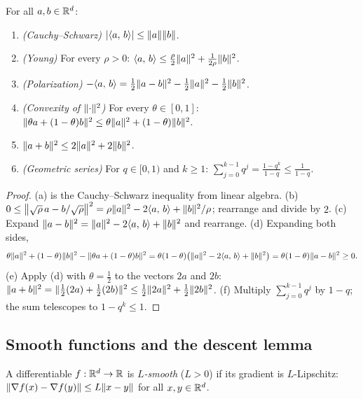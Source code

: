 \begin{lemma}\label{lem:elementary}
For all $a,b\in\mathbb{R}^d$:
\begin{enumerate}[label=\textup{(\alph*)}]
  \item \emph{(Cauchy--Schwarz)} $|\langle a,\, b\rangle|\le\lVert a\rVert\lVert b\rVert$.
  \item \emph{(Young)} For every $\rho>0$:
        $\langle a,\, b\rangle\le\frac{\rho}{2}\lVert a\rVert^2+\frac{1}{2\rho}\lVert b\rVert^2$.
  \item \emph{(Polarization)} $-\langle a,\, b\rangle=\frac12\lVert a-b\rVert^2-\frac12\lVert a\rVert^2-\frac12\lVert b\rVert^2$.
  \item \emph{(Convexity of $\lVert \cdot\rVert^2$)} For every $\theta\in[0,1]$:
        $\lVert \theta a+(1-\theta)b\rVert^2\le\theta\lVert a\rVert^2+(1-\theta)\lVert b\rVert^2$.
  \item $\lVert a+b\rVert^2\le2\lVert a\rVert^2+2\lVert b\rVert^2$.
  \item \emph{(Geometric series)} For $q\in[0,1)$ and $k\ge1$:
        $\sum_{j=0}^{k-1}q^j=\frac{1-q^k}{1-q}\le\frac{1}{1-q}$.
\end{enumerate}
\end{lemma}

\begin{proof}
(a) is the Cauchy--Schwarz inequality from linear algebra.
(b) $0\le\bigl\lVert \sqrt\rho\,a-b/\sqrt\rho\bigr\rVert^2=\rho\lVert a\rVert^2-2\langle a,\, b\rangle+\lVert b\rVert^2/\rho$;
rearrange and divide by $2$.
(c) Expand $\lVert a-b\rVert^2=\lVert a\rVert^2-2\langle a,\, b\rangle+\lVert b\rVert^2$ and rearrange.
(d) Expanding both sides,
\[
\theta\lVert a\rVert^2+(1-\theta)\lVert b\rVert^2-\lVert \theta a+(1-\theta)b\rVert^2
=\theta(1-\theta)\bigl(\lVert a\rVert^2-2\langle a,\, b\rangle+\lVert b\rVert^2\bigr)=\theta(1-\theta)\lVert a-b\rVert^2\ge0 .
\]
(e) Apply (d) with $\theta=\frac12$ to the vectors $2a$ and $2b$:
$\lVert a+b\rVert^2=\lVert \tfrac12(2a)+\tfrac12(2b)\rVert^2\le\tfrac12\lVert 2a\rVert^2+\tfrac12\lVert 2b\rVert^2$.
(f) Multiply $\sum_{j=0}^{k-1}q^j$ by $1-q$; the sum telescopes to $1-q^k\le1$.
\end{proof}

\subsection{Smooth functions and the descent lemma}

\begin{definition}[$L$-smoothness]\label{def:smooth}
A differentiable $f:\mathbb{R}^d\to\mathbb{R}$ is \emph{$L$-smooth} ($L>0$) if its gradient is
$L$-Lipschitz:
$\lVert \nabla f(x)-\nabla f(y)\rVert\le L\lVert x-y\rVert$ for all $x,y\in\mathbb{R}^d$.
\end{definition}


